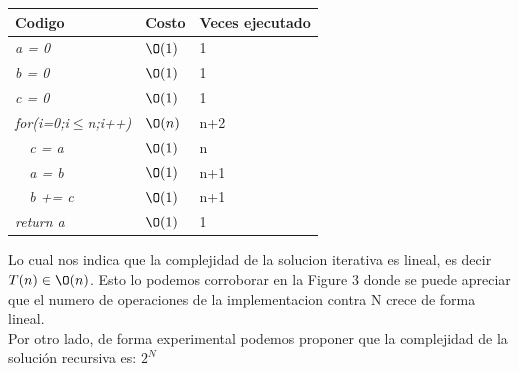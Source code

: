 \documentclass[spanish]{article}
\begin{document}
	\begin{center}
		\begin{table}[H]
			\begin{tabular}{|l|l|l|}
				\hline
				\rowcolor[HTML]{FFCC67} 
				Codigo                           & Costo & Veces ejecutado \\ \hline
				\textit{a = 0}                    & $\O(1)$    & 1               \\ \hline
				\textit{b = 0}                    & $\O(1)$    & 1               \\ \hline
				\textit{c = 0}                    & $\O(1)$    & 1               \\ \hline						
				\textit{for(i=0;i$\leq$n;i++)} & $\O(n)$    & n+2             \\ \hline
				\textit{\  \  c = a}                 & $\O(1)$    & n               \\ \hline
				\textit{\  \  a = b}                     & $\O(1)$    & n+1               \\ \hline
				\textit{\  \  b += c}                     & $\O(1)$    & n+1               \\ \hline
				\textit{return a}                & $\O(1)$    & 1               \\ \hline
			\end{tabular}
		\end{table}										
	\end{center}			
	Lo cual nos indica que la complejidad de la solucion iterativa es lineal, es decir $T(n)\in\O(n)$. Esto lo podemos corroborar en la Figure 3 donde se puede apreciar que el numero de operaciones de la implementacion contra N crece de forma lineal.\\			
	Por otro lado, de forma experimental podemos proponer que la complejidad de la solución recursiva es: $2^N$			
\end{document}
